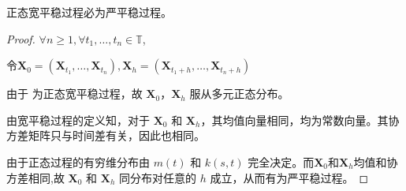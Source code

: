     \begin{theorem}
        正态宽平稳过程必为严平稳过程。
    \end{theorem}

    \begin{proof}
        $\forall n \geq 1, \forall t_1 , \ldots, t_n \in \mathbb{T}$,
        
        令$\textbf{X}_0 = (\textbf{X}_{t_1}, \ldots, \textbf{X}_{t_n}), \textbf{X}_h = (\textbf{X}_{t_1 + h}, \ldots, \textbf{X}_{t_n + h})$

        由于 \StochasticProcess 为正态宽平稳过程，故 $\textbf{X}_0$，$\textbf{X}_h$ 服从多元正态分布。

        由宽平稳过程的定义知，对于 $\textbf{X}_0$ 和 $\textbf{X}_h$，其均值向量相同，均为常数向量。其协方差矩阵只与时间差有关，因此也相同。
        
        由于正态过程的有穷维分布由 $m(t)$ 和 $k(s, t)$ 完全决定。而$\textbf{X}_0$和$\textbf{X}_h$均值和协方差相同,故 $\textbf{X}_0$ 和 $\textbf{X}_h$ 同分布对任意的 $h$ 成立，从而有\StochasticProcess 为严平稳过程。
    \end{proof}